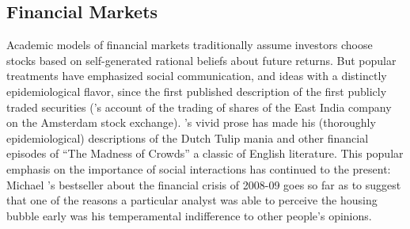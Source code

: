 \subsection{Financial Markets}\label{subsec:assetprice}





Academic models of financial markets traditionally assume investors choose stocks based on self-generated rational beliefs about future returns.  But popular treatments have emphasized social communication, and ideas with a distinctly epidemiological flavor, since the first published description of  the first publicly traded securities (\cite{vegaConfusion}'s account of the trading of shares of the East India company on the Amsterdam stock exchange).  \cite{mackay_memoirs_1852}'s vivid prose has made his (thoroughly epidemiological) descriptions of the Dutch Tulip mania and other financial episodes of ``The Madness of Crowds'' a classic of English literature.  This popular emphasis on the importance of social interactions has continued to the present: Michael \cite{lewis2011big}'s bestseller about the financial crisis of 2008-09 goes so far as to suggest that one of the reasons a particular analyst was able to perceive the housing bubble early was his temperamental indifference to other people's opinions.

